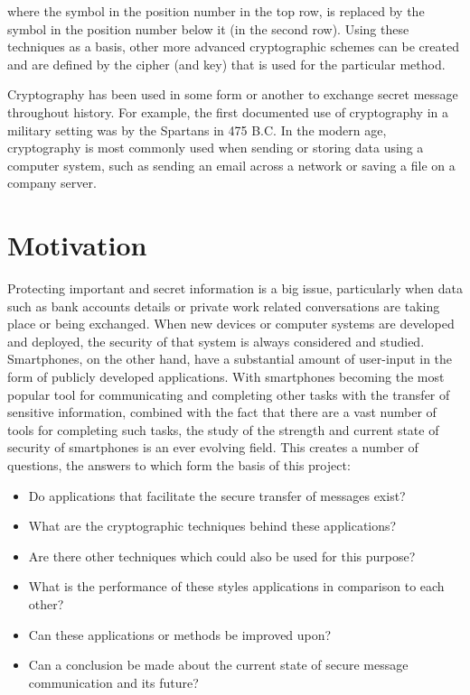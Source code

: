\documentclass[a4paper,12pt]{report}
\begin{document}
where the symbol in the position number in the top row, is replaced by the symbol in the position number below it (in the second row). Using these techniques as a basis, other more advanced cryptographic schemes can be created and are defined by the cipher (and key) that is used for the particular method.

Cryptography has been used in some form or another to exchange secret message throughout history. For example, the first documented use of cryptography in a military setting was by the Spartans in 475 B.C. In the modern age, cryptography is most commonly used when sending or storing data using a computer system, such as sending an email across a network or saving a file on a company server. 

\section{Motivation}

Protecting important and secret information is a big issue, particularly when data such as bank accounts details or private work related conversations are taking place or being exchanged. When new devices or computer systems are developed and deployed, the security of that system is always considered and studied. Smartphones, on the other hand, have a substantial amount of user-input in the form of publicly developed applications. With smartphones becoming the most popular tool for communicating and completing other tasks with the transfer of sensitive information, combined with the fact that there are a vast number of tools for completing such tasks, the study of the strength and current state of security of smartphones is an ever evolving field. This creates a number of questions, the answers to which form the basis of this project:

\begin{itemize}
 \item Do applications that facilitate the secure transfer of messages exist?
 \item What are the cryptographic techniques behind these applications?
 \item Are there other techniques which could also be used for this purpose?
 \item What is the performance of these styles applications in comparison to each other?
 \item Can these applications or methods be improved upon?
 \item Can a conclusion be made about the current state of secure message communication and its future? 
\end{itemize}
\end{document}
